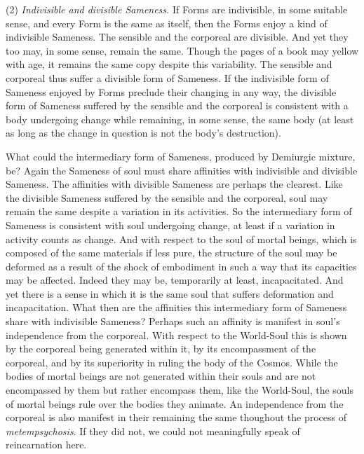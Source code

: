 (2) \emph{Indivisible and divisible Sameness.} If Forms are indivisible, in some suitable sense, and every Form is the same as itself, then the Forms enjoy a kind of indivisible Sameness. The sensible and the corporeal are divisible. And yet they too may, in some sense, remain the same. Though the pages of a book may yellow with age, it remains the same copy despite this variability. The sensible and corporeal thus suffer a divisible form of Sameness. If the indivisible form of Sameness enjoyed by Forms preclude their changing in any way, the divisible form of Sameness suffered by the sensible and the corporeal is consistent with a body undergoing change while remaining, in some sense, the same body (at least as long as the change in question is not the body's destruction).

What could the intermediary form of Sameness, produced by Demiurgic mixture, be? Again the Sameness of soul must share affinities with indivisible and divisible Sameness. The affinities with divisible Sameness are perhaps the clearest. Like the divisible Sameness suffered by the sensible and the corporeal, soul may remain the same despite a variation in its activities. So the intermediary form of Sameness is consistent with soul undergoing change, at least if a variation in activity counts as change. And with respect to the soul of mortal beings, which is composed of the same materials if less pure, the structure of the soul may be deformed as a result of the shock of embodiment in such a way that its capacities may be affected. Indeed they may be, temporarily at least, incapacitated. And yet there is a sense in which it is the same soul that suffers deformation and incapacitation. What then are the affinities this intermediary form of Sameness share with indivisible Sameness? Perhaps such an affinity is manifest in soul's independence from the corporeal. With respect to the World-Soul this is shown by the corporeal being generated within it, by its encompassment of the corporeal, and by its superiority in ruling the body of the Cosmos. While the bodies of mortal beings are not generated within their souls and are not encompassed by them but rather encompass them, like the World-Soul, the souls of mortal beings rule over the bodies they animate. An independence from the corporeal is also manifest in their remaining the same thoughout the process of \emph{metempsychosis}. If they did not, we could not meaningfully speak of reincarnation here.

